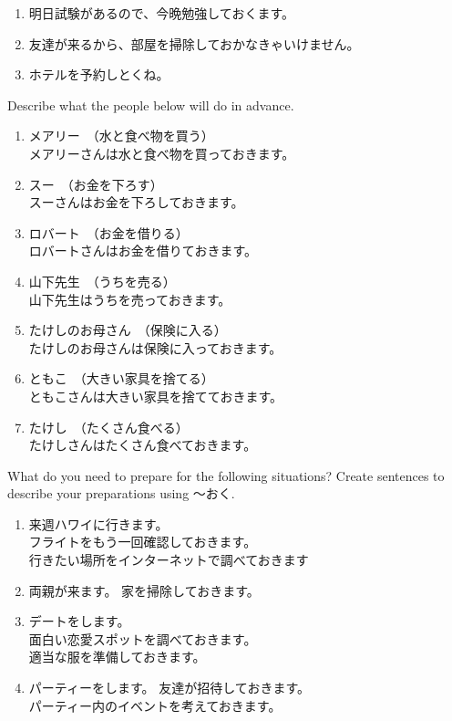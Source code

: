 \documentclass[notoc,notitlepage]{tufte-book}
\begin{document}
\begin{eg}
  \begin{enumerate}
    \item 明日試験があるので、今晩勉強しておくます。
    \item 友達が来るから、部屋を掃除しておかなきゃいけません。
    \item ホテルを予約しとくね。
  \end{enumerate}
\end{eg}

\begin{ex}
  Describe what the people below will do in advance.

  \begin{enumerate}
    \item メアリー　（水と食べ物を買う） \\
      メアリーさんは水と食べ物を買っておきます。
    \item スー　（お金を下ろす）\\
      スーさんはお金を下ろしておきます。
    \item ロバート　（お金を借りる）\\
      ロバートさんはお金を借りておきます。
    \item 山下先生　（うちを売る） \\
      山下先生はうちを売っておきます。
    \item たけしのお母さん　（保険に入る）\\
      たけしのお母さんは保険に入っておきます。
    \item ともこ　（大きい家具を捨てる）\\
      ともこさんは大きい家具を捨てておきます。
    \item たけし　（たくさん食べる）\\
      たけしさんはたくさん食べておきます。
  \end{enumerate}
\end{ex}

\begin{ex}
  What do you need to prepare for the following situations? Create sentences to describe your preparations using 〜おく.

  \begin{enumerate}
    \item 来週ハワイに行きます。\\
      フライトをもう一回確認しておきます。\\
      行きたい場所をインターネットで調べておきます
    \item 両親が来ます。
      家を掃除しておきます。
    \item デートをします。\\
      面白い恋愛スポットを調べておきます。\\
      適当な服を準備しておきます。
    \item パーティーをします。
      友達が招待しておきます。\\
      パーティー内のイベントを考えておきます。
  \end{enumerate}
\end{ex}
\end{document}

